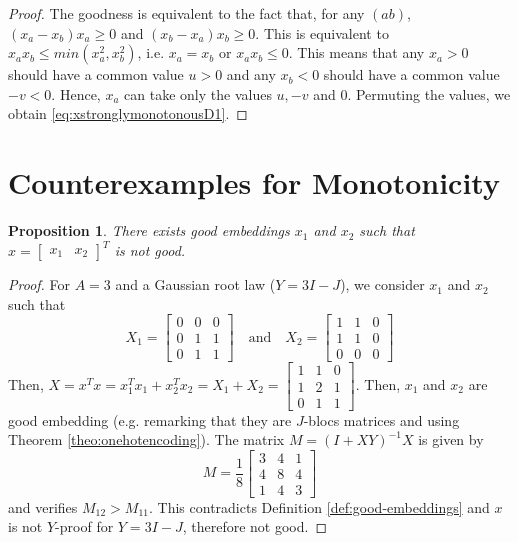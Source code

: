 \documentclass{article}
\newtheorem{proposition}{Proposition}
\begin{document}
\begin{proof}
     The goodness is equivalent to the fact that, for any $(ab)$, $(x_a - x_b)x_a \geq 0$ and $(x_b - x_a) x_b \geq 0$. This is equivalent to $x_a x_b \leq min (x_a^2, x_b^2)$, i.e. $x_a = x_b$ or $x_a x_b \leq 0$. This means that any $x_a > 0$ should have a common value $u>0$ and any $x_b < 0$ should have a common value $- v < 0$. Hence, $x_a$ can take only the values $u, -v$ and $0$. Permuting the values, we obtain \eqref{eq:xstronglymonotonousD1}.
 \end{proof}


\section{Counterexamples for Monotonicity}
\label{app:counterexamples}

\begin{proposition}
\label{prop:counterexamplea}
    There exists good embeddings $x_1$ and $x_2$ such that $x=\begin{bmatrix}
        x_1 &
        x_2
    \end{bmatrix}^T$ is not good.
\end{proposition}

\begin{proof}
     For $A=3$ and a Gaussian root law ($Y = 3 I - J$), we consider $x_1$ and $x_2$ such that
$$
X_1 = \begin{bmatrix}
0 & 0 & 0 \\
0 & 1 & 1 \\
0 & 1 & 1
\end{bmatrix} \quad
 \text{and} \quad
X_2 = \begin{bmatrix}
1 & 1 & 0 \\
1 & 1 & 0 \\
0 & 0 & 0
\end{bmatrix}$$
Then, $X = x^T x = x_1^T x_1 + x_2^T x_2 = X_1 + X_2 = \begin{bmatrix}
1 & 1 & 0 \\
1 & 2 & 1 \\
0 & 1 & 1
\end{bmatrix}$.
Then, $x_1$ and $x_2$ are good embedding (e.g. remarking that they are $J$-blocs matrices and using Theorem \ref{theo:onehotencoding}). The matrix $M = (I + XY)^{-1} X$ is given by
$$M =\frac{1}{8} \begin{bmatrix}
            {3} & {4} & 1 \\
            {4} & 8 & 4 \\
            1 & 4 & 3 
\end{bmatrix}$$
and verifies $M_{12} > M_{11}$. This contradicts Definition \ref{def:good-embeddings} and $x$ is not $Y$-proof for $Y = 3 I - J$, therefore not good. 
\end{proof}
\end{document}
